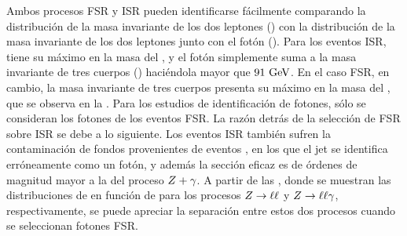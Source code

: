 Ambos procesos \ac{FSR} y \ac{ISR} pueden identificarse fácilmente comparando la distribución de la masa invariante de los dos leptones (\mll) con la distribución de la masa invariante de los dos leptones junto con el fot\'on (\mlly).
Para los eventos \ac{ISR}, \mll tiene su m\'aximo en la masa del \Zboson, y el fotón simplemente suma a la masa invariante de tres cuerpos (\mlly) haciéndola mayor que \(91~\text{GeV}\). En el caso \ac{FSR}, en cambio, la masa invariante de tres cuerpos \mlly presenta su m\'aximo en la masa del \Zboson, que se observa en la \Fig{\ref{fig:pid_ss:event_selection:mll_mlly_distribution:data}}.
Para los estudios de identificación de fotones, sólo se consideran los fotones de los eventos \ac{FSR}. La razón detrás de la selección de \ac{FSR} sobre \ac{ISR} se debe a lo siguiente. Los eventos \ac{ISR} también sufren la contaminación de fondos provenientes de eventos \Zjets, en los que el jet se identifica erróneamente como un fotón, y adem\'as la sección eficaz \Zjets es de \'ordenes de magnitud mayor a la del proceso \(Z+\gamma\). A partir de las \Figs{\ref{fig:pid_ss:event_selection:mll_mlly_distribution:bkg}}{\ref{fig:pid_ss:event_selection:mll_mlly_distribution:signal}}, donde se muestran las distribuciones de \mll en funci\'on de \mlly para los procesos \(Z\rightarrow\ell\ell\) y \(Z\rightarrow\ell\ell\gamma\), respectivamente, se puede apreciar la separación entre estos dos procesos cuando se seleccionan fotones \ac{FSR}.

